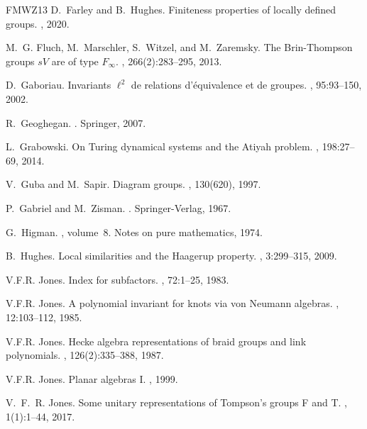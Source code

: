 \documentclass[a4paper, 12pt]{amsart}
\numberwithin{equation}{section}
\theoremstyle{definition}
\begin{document}
\begin{thebibliography}{FMWZ13}
D.~Farley and B.~Hughes.
\newblock Finiteness properties of locally defined groups.
, 2020.

M.~G. Fluch, M.~Marschler, S.~Witzel, and M.~Zaremsky.
\newblock The {B}rin-{T}hompson groups $s{V}$ are of type ${F}_\infty$.
, 266(2):283--295, 2013.

D.~Gaboriau.
\newblock Invariants $\ell^2$ de relations d'\'equivalence et de groupes.
, 95:93--150, 2002.

R.~Geoghegan.
.
\newblock Springer, 2007.

L.~Grabowski.
\newblock On {T}uring dynamical systems and the {A}tiyah problem.
, 198:27--69, 2014.

V.~Guba and M.~Sapir.
\newblock Diagram groups.
, 130(620), 1997.

P.~Gabriel and M.~Zisman.
.
\newblock Springer-Verlag, 1967.

G.~Higman.
, volume~8.
\newblock Notes on pure mathematics, 1974.

B.~Hughes.
\newblock Local similarities and the {H}aagerup property.
, 3:299--315, 2009.

V.F.R. Jones.
\newblock Index for subfactors.
, 72:1--25, 1983.

V.F.R. Jones.
\newblock A polynomial invariant for knots via von {N}eumann algebras.
, 12:103--112, 1985.

V.F.R. Jones.
\newblock Hecke algebra representations of braid groups and link polynomials.
, 126(2):335--388, 1987.

V.F.R. Jones.
\newblock Planar algebras {I}.
, 1999.

V.~F.~R. Jones.
\newblock Some unitary representations of {T}ompson's groups {F} and {T}.
, 1(1):1--44, 2017.


\end{thebibliography}
\end{document}
